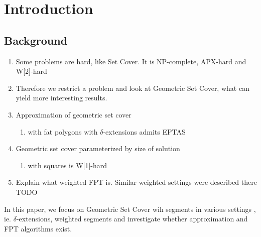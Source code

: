 \chapter{Introduction}

\section{Background}
\begin{enumerate}
\item Some problems are hard, like Set Cover. It is NP-complete,
APX-hard and W[2]-hard \cite{platypus_book}
\item Therefore we restrict a problem and look at Geometric Set Cover,
      what can yield more interesting results.
\item Approximation of geometric set cover
	\begin{enumerate}
		\item with fat polygons with $\delta$-extensions admits EPTAS \cite{harpeled12}
	\end{enumerate}
\item Geometric set cover parameterized by size of solution
	\begin{enumerate}
		\item with squares is W[1]-hard
	\end{enumerate}
\item Explain what weighted FPT is. Similar weighted settings
were described there TODO
\end{enumerate}

In this paper, we focus on Geometric Set Cover wih segments
in various settings , ie. $\delta$-extensions, weighted segments
and investigate whether approximation and FPT algorithms exist.


